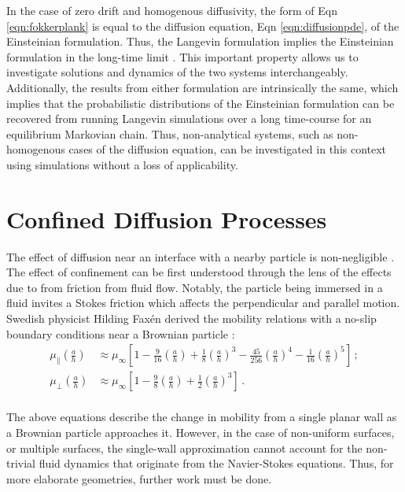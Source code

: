 In the case of zero drift and homogenous diffusivity, the form of Eqn \ref{eqn:fokkerplank} is equal to the diffusion equation, Eqn \ref{eqn:diffusionpde}, of the Einsteinian formulation. Thus, the  Langevin formulation implies the Einsteinian formulation in the long-time limit \cite{walter_fokker-planck}. This important property allows us to investigate solutions and dynamics of the two systems interchangeably. Additionally, the results from either formulation are intrinsically the same, which implies that the probabilistic distributions of the Einsteinian formulation can be recovered from running Langevin simulations over a long time-course for an equilibrium Markovian chain. Thus, non-analytical systems, such as non-homogenous cases of the diffusion equation, can be investigated in this context using simulations without a loss of applicability. 

\clearpage
\section{Confined Diffusion Processes}

The effect of diffusion near an interface with a nearby particle is non-negligible \cite{bian111YearsBrownian2016}. The effect of confinement can be first understood through the lens of the effects due to from friction from fluid flow. Notably, the particle being immersed in a fluid invites a Stokes friction which affects the perpendicular and parallel motion. Swedish physicist Hilding Faxén derived the mobility relations with a no-slip boundary conditions near a Brownian particle \cite{Faxen1921,bian111YearsBrownian2016}:
\begin{equation}\label{eqn:faxen}
	\begin{aligned}
		\mu_\parallel\left(\frac{a}{h}\right) &\approx \mu_\infty \left[1 - \frac{9}{16} \left(\frac{a}{h}\right)  + \frac{1}{8} \left(\frac{a}{h}\right)^3 - \frac{45}{256} \left(\frac{a}{h}\right)^4 - \frac{1}{16} \left(\frac{a}{h}\right)^5\right]\,;\\
		\mu_\perp \left(\frac{a}{h}\right) &\approx \mu_\infty \left[1 - \frac{9}{8} \left(\frac{a}{h}\right)  + \frac{1}{2} \left(\frac{a}{h}\right)^3  \right]\,.\\
	\end{aligned}
\end{equation}

The above equations describe the change in mobility from a single planar wall as a Brownian particle approaches it. However, in the case of non-uniform surfaces, or multiple surfaces, the single-wall approximation cannot account for the non-trivial fluid dynamics that originate from the Navier-Stokes equations. Thus, for more elaborate geometries, further work must be done. 

